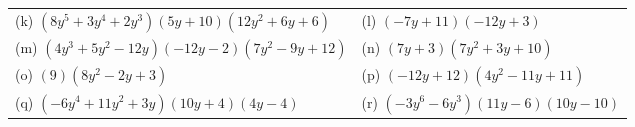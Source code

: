 \begin{enumerate}[noitemsep, label=\textbf{\arabic*}. ]
{\begin{center}
\begin{xtabular*}{\mytablewidth}[t]{|p{10\mystarwidth}|p{10\mystarwidth}|}
        (k) $\left(8{y}^{5}+3{y}^{4}+2{y}^{3}\right)\left(5y+10\right)\left(12{y}^{2}+6y+6\right)$ &
        (l) $\left(-7y+11\right)\left(-12y+3\right)$%
     \tabularnewline{}
        (m) $\left(4{y}^{3}+5{y}^{2}-12y\right)\left(-12y-2\right)\left(7{y}^{2}-9y+12\right)$ &
        (n) $\left(7y+3\right)\left(7{y}^{2}+3y+10\right)$%
     \tabularnewline{}
        (o) $\left(9\right)\left(8{y}^{2}-2y+3\right)$ &
        (p) $\left(-12y+12\right)\left(4{y}^{2}-11y+11\right)$%
     \tabularnewline{}
        (q) $\left(-6{y}^{4}+11{y}^{2}+3y\right)\left(10y+4\right)\left(4y-4\right)$ &
        (r) $\left(-3{y}^{6}-6{y}^{3}\right)\left(11y-6\right)\left(10y-10\right)$%
     \tabularnewline{}

\end{xtabular*}
\end{center}}
\end{enumerate}
